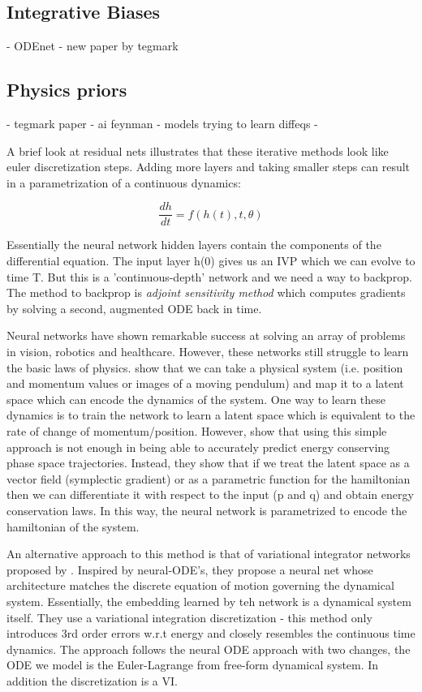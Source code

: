 \documentclass{article}
\begin{document}
\subsection{Integrative Biases}
- ODEnet
- new paper by tegmark

\subsection{Physics priors}
- tegmark paper
- ai feynman
- models trying to learn diffeqs
- 








A brief look at residual nets illustrates that these iterative methods look like euler discretization steps. Adding more layers and taking smaller steps can result in a parametrization of a continuous dynamics:

$$ \frac{dh}{dt} = f(h(t),t,\theta) $$

Essentially the neural network hidden layers contain the components of the differential equation. The input layer h(0) gives us an IVP which we can evolve to time T. But this is a 'continuous-depth' network and we need a way to backprop. The method to backprop is \textit{adjoint sensitivity method}  which computes gradients by solving a second, augmented ODE back in time. 




Neural networks have shown remarkable success at solving an array of problems in vision, robotics and healthcare. However, these networks still struggle to learn the basic laws of physics. 
\cite{greydanus_hamiltonian_2019} show that we can take a physical system (i.e. position and momentum values or images of a moving pendulum) and map it to a latent space which can encode the dynamics of the system. One way to learn these dynamics is to train the network to learn a latent space which is equivalent to the rate of change of momentum/position. However, \cite{greydanus_hamiltonian_2019} show that using this simple approach is not enough in being able to accurately predict energy conserving phase space trajectories. Instead, they show that if we treat the latent space as a vector field (symplectic gradient) or as a parametric function for the hamiltonian then we can differentiate it with respect to the input (p and q) and obtain energy conservation laws. In this way, the neural network is parametrized to encode the hamiltonian of the system.

An alternative approach to this method is that of variational integrator networks proposed by \cite{saemundsson_variational_2019}. Inspired by neural-ODE's, they propose a neural net whose architecture matches the discrete equation of motion governing the dynamical system. Essentially, the embedding learned by teh network is a dynamical system itself. They use a variational integration discretization - this method only introduces 3rd order errors w.r.t energy and closely resembles the continuous time dynamics. The approach follows the neural ODE approach with two changes, the ODE we model is the Euler-Lagrange from free-form dynamical system. In addition the discretization is a VI. 
\end{document}
